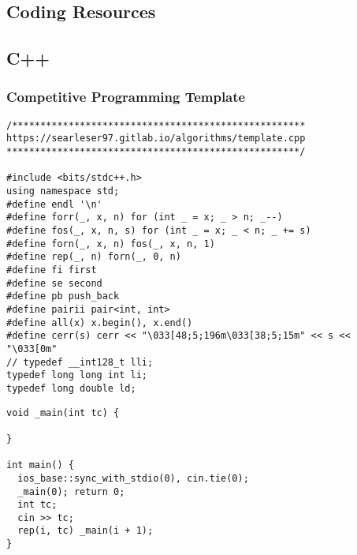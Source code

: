 \documentclass[twoside]{article}
\begin{document}

\null
\thispagestyle{empty}
\newpage
{}
\selectfont
\begin{multicols*}{2}
	\tableofcontents
	\newpage
	\cleardoublepage
\sectionfont{\bfseries\sffamily\centering\Huge}
\vspace{1em}
\section*{Coding Resources}
\vspace{3em}
\subsectionfont{\bfseries\sffamily\centering\LARGE}
\vspace{0em}
\subsection*{C++}
\vspace{2em}
\subsubsectionfont{\large\bfseries\sffamily\underline}
\subsubsection*{Competitive Programming Template}
\begin{verbatim}
/****************************************************
https://searleser97.gitlab.io/algorithms/template.cpp
****************************************************/

#include <bits/stdc++.h>
using namespace std;
#define endl '\n'
#define forr(_, x, n) for (int _ = x; _ > n; _--)
#define fos(_, x, n, s) for (int _ = x; _ < n; _ += s)
#define forn(_, x, n) fos(_, x, n, 1)
#define rep(_, n) forn(_, 0, n)
#define fi first
#define se second
#define pb push_back
#define pairii pair<int, int>
#define all(x) x.begin(), x.end()
#define cerr(s) cerr << "\033[48;5;196m\033[38;5;15m" << s << "\033[0m"
// typedef __int128_t lli;
typedef long long int li;
typedef long double ld;
\end{verbatim}
\vspace{-12pt}
\begin{verbatim}
void _main(int tc) {
  
}

int main() {
  ios_base::sync_with_stdio(0), cin.tie(0);
  _main(0); return 0;
  int tc;
  cin >> tc;
  rep(i, tc) _main(i + 1);
}
\end{verbatim}


\end{multicols*}
\end{document}
